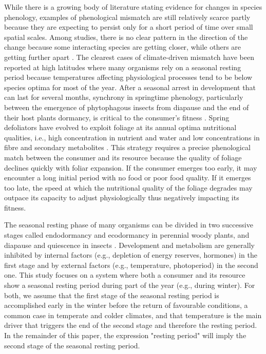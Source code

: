 \documentclass[12 pt]{article}
\begin{document}
While there is a growing body of literature stating evidence for changes in species phenology, examples of phenological mismatch are still relatively scarce \citep{Renner2018} partly because they are expecting to persist only for a short period of time over small spatial scales. Among studies, there is no clear pattern in the direction of the change because some interacting species are getting closer, while others are getting further apart \citep{Kharouba2018}. The clearest cases of climate-driven mismatch have been reported at high latitudes where many organisms rely on a seasonal resting period because temperatures affecting physiological processes tend to be below species optima for most of the year. After a seasonal arrest in development that can last for several months, synchrony in springtime phenology, particularly between the emergence of phytophagous insects from diapause and the end of their host plants dormancy, is critical to the consumer’s fitness \citep{VanAsch2007}. Spring defoliators have evolved to exploit foliage at its annual optima nutritional qualities, i.e., high concentration in nutrient and water and low concentrations in fibre and secondary metabolites \citep{Hunter1992,Mattson1987}. This strategy requires a precise phenological match between the consumer and its resource because the quality of foliage declines quickly with foliar expansion. If the consumer emerges too early, it may encounter a long initial period with no food or poor food quality. If it emerges too late, the speed at which the nutritional quality of the foliage degrades may outpace its capacity to adjust physiologically thus negatively impacting its fitness. \par   
The seasonal resting phase of many organisms can be divided in two successive stages called endodormancy and ecodormancy in perennial woody plants, and diapause and quiescence in insects \citep{Chuine2017}. Development and metabolism are generally inhibited by internal factors (e.g., depletion of energy reserves, hormones) in the first stage and by external factors (e.g., temperature, photoperiod) in the second one. This study focuses on a system where both a consumer and its resource show a seasonal resting period during part of the year (e.g., during winter). For both, we assume that the first stage of the seasonal resting period is accomplished early in the winter before the return of favourable conditions, a common case in temperate and colder climates, and that temperature is the main driver that triggers the end of the second stage and therefore the resting period. In the remainder of this paper, the expression "resting period" will imply the second stage of the seasonal resting period.\par 
\end{document}
